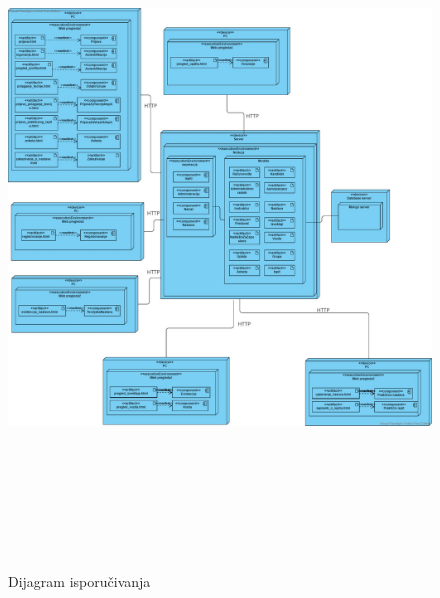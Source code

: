 \begin{figure}[H]
    \begin{center}
        \includegraphics[width=\textwidth, height=700px]{Diagrams/dijagram_isporucivanja.jpeg}
    \end{center}
    \caption {Dijagram isporučivanja}
    \label{dijagram_isporučivanja}
  
  \end{figure}

  \newpage
